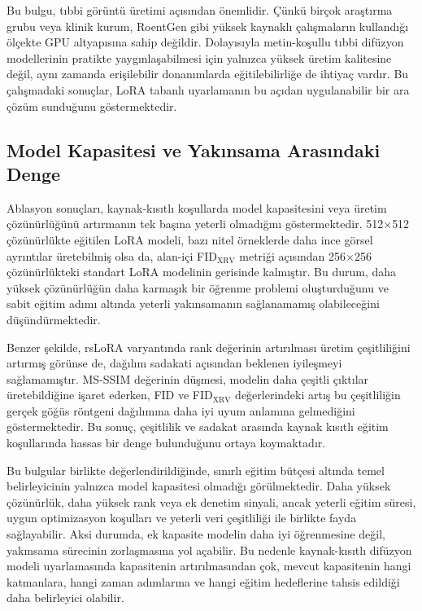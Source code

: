 \documentclass[11pt]{article}
\begin{document}
Bu bulgu, tıbbi görüntü üretimi açısından önemlidir. Çünkü birçok araştırma
grubu veya klinik kurum, RoentGen gibi yüksek kaynaklı çalışmaların kullandığı
ölçekte GPU altyapısına sahip değildir. Dolayısıyla metin-koşullu tıbbi
difüzyon modellerinin pratikte yaygınlaşabilmesi için yalnızca yüksek üretim
kalitesine değil, aynı zamanda erişilebilir donanımlarda eğitilebilirliğe de
ihtiyaç vardır. Bu çalışmadaki sonuçlar, LoRA tabanlı uyarlamanın bu açıdan
uygulanabilir bir ara çözüm sunduğunu göstermektedir.

\subsection{Model Kapasitesi ve Yakınsama Arasındaki Denge}

Ablasyon sonuçları, kaynak-kısıtlı koşullarda model kapasitesini veya üretim
çözünürlüğünü artırmanın tek başına yeterli olmadığını göstermektedir.
512$\times$512 çözünürlükte eğitilen LoRA modeli, bazı nitel örneklerde daha
ince görsel ayrıntılar üretebilmiş olsa da, alan-içi FID$_{\text{XRV}}$ metriği
açısından 256$\times$256 çözünürlükteki standart LoRA modelinin gerisinde
kalmıştır. Bu durum, daha yüksek çözünürlüğün daha karmaşık bir öğrenme problemi
oluşturduğunu ve sabit eğitim adımı altında yeterli yakınsamanın
sağlanamamış olabileceğini düşündürmektedir.

Benzer şekilde, rsLoRA varyantında rank değerinin artırılması üretim
çeşitliliğini artırmış görünse de, dağılım sadakati açısından beklenen
iyileşmeyi sağlamamıştır. MS-SSIM değerinin düşmesi, modelin daha çeşitli
çıktılar üretebildiğine işaret ederken, FID ve FID$_{\text{XRV}}$ değerlerindeki
artış bu çeşitliliğin gerçek göğüs röntgeni dağılımına daha iyi uyum anlamına
gelmediğini göstermektedir. Bu sonuç, çeşitlilik ve sadakat arasında kaynak
kısıtlı eğitim koşullarında hassas bir denge bulunduğunu ortaya koymaktadır.

Bu bulgular birlikte değerlendirildiğinde, sınırlı eğitim bütçesi altında
temel belirleyicinin yalnızca model kapasitesi olmadığı görülmektedir. Daha
yüksek çözünürlük, daha yüksek rank veya ek denetim sinyali, ancak yeterli
eğitim süresi, uygun optimizasyon koşulları ve yeterli veri çeşitliliği ile
birlikte fayda sağlayabilir. Aksi durumda, ek kapasite modelin daha iyi
öğrenmesine değil, yakınsama sürecinin zorlaşmasına yol açabilir. Bu nedenle
kaynak-kısıtlı difüzyon modeli uyarlamasında kapasitenin artırılmasından çok,
mevcut kapasitenin hangi katmanlara, hangi zaman adımlarına ve hangi eğitim
hedeflerine tahsis edildiği daha belirleyici olabilir.
\end{document}
